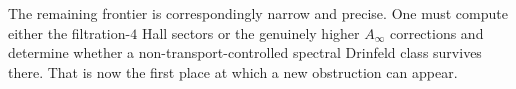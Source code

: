 The remaining frontier is correspondingly narrow and precise. One must
compute either the filtration-$4$ Hall sectors or the genuinely higher
$A_\infty$ corrections and determine whether a non-transport-controlled
spectral Drinfeld class survives there. That is now the first place at
which a new obstruction can appear.
